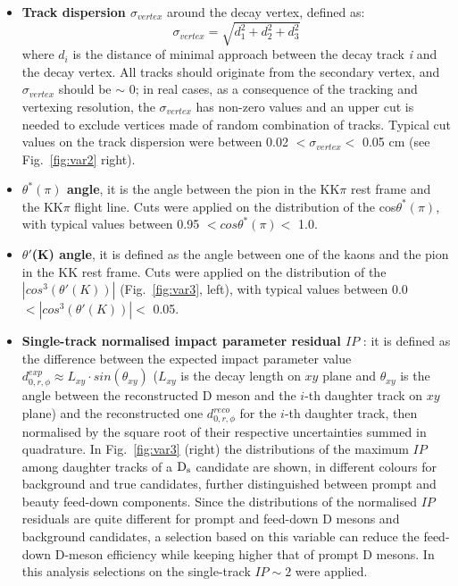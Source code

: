 \begin{itemize}
\item \textbf{Track dispersion $\sigma_{vertex}$} around the decay vertex, defined as:
\[
\sigma_{vertex}=\sqrt{d^2_1+d^2_2+d^2_3}
\]
where $d_i$ is the distance of minimal approach between the decay 
track \textit{i} and the decay vertex. All tracks should originate from 
the secondary vertex, and $\sigma_{vertex}$ should be $\sim$ 0; in 
real cases, as a consequence of the tracking and vertexing resolution, 
the $\sigma_{vertex}$ has non-zero values and an upper cut is needed 
to exclude vertices made of random combination of tracks. Typical cut
 values on the track dispersion were between 0.02 $< \sigma_{vertex}<$ 0.05 cm 
 (see Fig.~\ref{fig:var2} right).
\item \textbf{$\theta^*(\pi)$ angle}, it is the angle between the pion 
in the KK$\pi$ rest frame and the KK$\pi$ flight line. Cuts were applied
 on the distribution of the cos$\theta^*(\pi)$, with typical values 
 between 0.95 $<cos\theta^*(\pi)  <$ 1.0.
\item \textbf{$\theta'$(K) angle}, it is defined as the angle between
 one of the kaons and the pion in the KK rest frame. Cuts were 
 applied on the distribution of the $|cos^3(\theta'(K))|$ (Fig.~\ref{fig:var3}, left), with typical 
 values between 0.0 $<|cos^3(\theta'(K))| <$ 0.05.
\item \textbf{Single-track normalised impact parameter residual $IP$} : it is defined 
as the difference between the expected 
impact parameter value $d^{exp}_{0,r,\phi} \approx L_{xy} \cdot sin(\theta_{xy})$
 ($L_{xy}$ is the decay length on $xy$ plane and $\theta_{xy}$ is the angle 
between the reconstructed D meson and the $i$-th daughter track on $xy$ plane) 
and the reconstructed one $d^{reco}_{0,r,\phi}$ for the $i$-th daughter
track, then normalised by the square 
root of their respective uncertainties summed in quadrature. 
In Fig.~\ref{fig:var3} (right) the distributions of the maximum $IP$ among 
daughter tracks of a ${\rm D_s}$ candidate are shown, in different colours for
background and true candidates, further distinguished between prompt and beauty 
feed-down components. Since the distributions of the normalised $IP$ residuals 
are quite different for prompt and feed-down D mesons and background candidates, 
a selection based on this variable can reduce the feed-down D-meson efficiency while keeping 
higher that of prompt D mesons. In this analysis selections on the single-track $IP \sim 2$
were applied.
\end{itemize}

